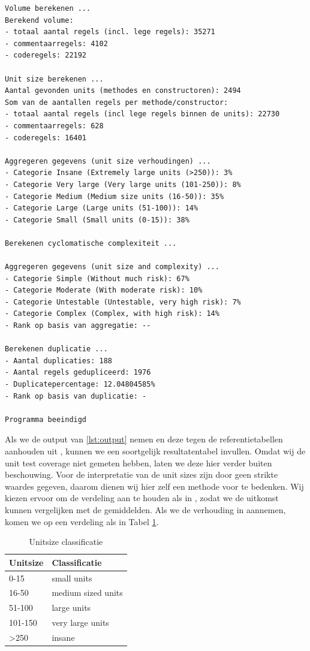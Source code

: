\documentclass[a4paper]{article}
\begin{document}
\begin{lstlisting}[caption={Programma output SmallSQL},label={lst:output},frame = single]
Volume berekenen ...
Berekend volume: 
- totaal aantal regels (incl. lege regels): 35271
- commentaarregels: 4102
- coderegels: 22192

Unit size berekenen ...
Aantal gevonden units (methodes en constructoren): 2494
Som van de aantallen regels per methode/constructor: 
- totaal aantal regels (incl lege regels binnen de units): 22730
- commentaarregels: 628
- coderegels: 16401

Aggregeren gegevens (unit size verhoudingen) ...
- Categorie Insane (Extremely large units (>250)): 3%
- Categorie Very large (Very large units (101-250)): 8%
- Categorie Medium (Medium size units (16-50)): 35%
- Categorie Large (Large units (51-100)): 14%
- Categorie Small (Small units (0-15)): 38%

Berekenen cyclomatische complexiteit ...

Aggregeren gegevens (unit size and complexity) ...
- Categorie Simple (Without much risk): 67%
- Categorie Moderate (With moderate risk): 10%
- Categorie Untestable (Untestable, very high risk): 7%
- Categorie Complex (Complex, with high risk): 14%
- Rank op basis van aggregatie: --

Berekenen duplicatie ...
- Aantal duplicaties: 188
- Aantal regels gedupliceerd: 1976
- Duplicatepercentage: 12.04804585%
- Rank op basis van duplicatie: -

Programma beeindigd
\end{lstlisting}
Als we de output van \ref{lst:output} nemen en deze tegen de referentietabellen aanhouden uit \cite{A}, kunnen we een
soortgelijk resultatentabel invullen. Omdat wij de unit test coverage niet gemeten hebben, laten we deze hier verder
buiten beschouwing. Voor de interpretatie van de unit sizes zijn door \cite{A} geen strikte waardes gegeven, daarom
dienen wij hier zelf een methode voor te bedenken. Wij kiezen ervoor om de verdeling aan te houden als in \cite{B},
zodat we de uitkomst kunnen vergelijken met de gemiddelden. Als we de verhouding in \cite{B} aannemen, komen we op 
een verdeling als in Tabel \ref{tbl:UnitSizeClassificatie}.


\begin{table}[h]
\centering
\caption{Unitsize classificatie}
\label{tbl:UnitSizeClassificatie}
\begin{tabular}{|l|l|}
\hline
Unitsize         & Classificatie      \\ \hline
0-15             & small units        \\
16-50            & medium sized units \\
51-100           & large units        \\
101-150          & very large units   \\
\textgreater{}250& insane             \\ \hline
\end{tabular}
\end{table}
\end{document}

